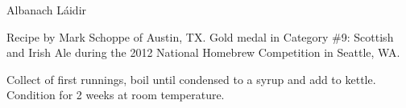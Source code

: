\stylesection{\styleweeheavy}

\begin{recipe}{Albanach Láidir}

\begin{aboutblock}
Recipe by Mark Schoppe of Austin, TX. Gold medal in Category \#9: Scottish and Irish
Ale during the 2012 National Homebrew Competition in Seattle, WA.
\sourceaha
\end{aboutblock}


\begin{methodandtiming}

\begin{mashsteps}
\end{mashsteps}

\begin{fermentationsteps}
\end{fermentationsteps}

\begin{directions}
Collect  of first runnings, boil until condensed to a syrup and add to kettle. 
Condition for 2 weeks at room temperature.
\end{directions}

\end{methodandtiming}

\recipebreak

\begin{ingredientsblock}

\begin{malts}
\end{malts}

\begin{hops}
\end{hops}


\end{ingredientsblock}

\end{recipe}

